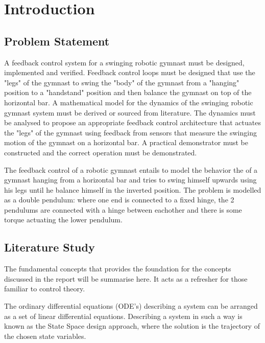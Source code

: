 \chapter{Introduction}
\label{chp:intro}


\section{Problem Statement}

A feedback control system for a swinging robotic gymnast must be designed, implemented and verified. Feedback control loops must be designed that use the "legs" of the gymnast to swing the "body" of the gymnast from a "hanging" position to a "handstand" position and then balance the gymnast on top of the horizontal bar. A mathematical model for the dynamics of the swinging robotic gymnast system must be derived or sourced from literature. The dynamics must be analysed to propose an appropriate feedback control architecture that actuates the "legs" of the gymnast using feedback from sensors that measure the swinging motion of the gymnast on a horizontal bar. A practical demonstrator must be constructed and the correct operation must be demonstrated.



The feedback control of a robotic gymnast entails to model the behavior the of a gymnast hanging from a horizontal bar and tries to swing himself upwards using his legs until he balance himself in the inverted position. The problem is modelled as a double pendulum: where one end is connected to a fixed hinge, the 2 pendulums are connected with a hinge between eachother and there is some torque actuating the lower pendulum.


\section{Literature Study}
The fundamental concepts that provides the foundation for the concepts discussed in the report will be summarise here. It acts as a refresher for those familiar to control theory. 

The ordinary differential equations (ODE's) describing a system can be arranged as a set of linear differential equations. Describing a system in such a way is known as the State Space design approach, where the solution is the trajectory of the chosen state variables.\cite{textbook}

